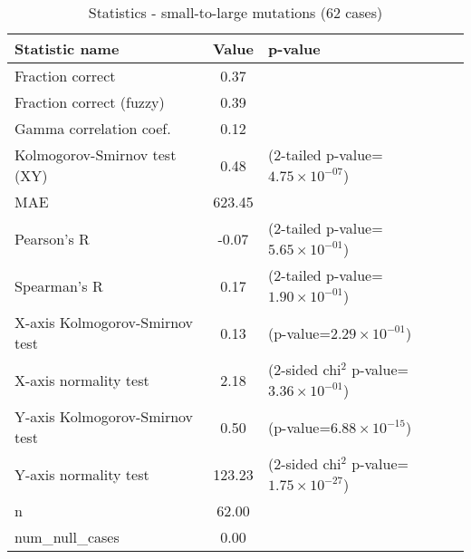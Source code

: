 \documentclass[10pt, letterpaper, oneside, titlepage, landscape]{scrreprt}
\begin{document}
\begin{table}[H]\begin{center}
\begin{tabular}{ l S[table-format=3.2] l}
Statistic name & {Value} & p-value\\
\hline
Fraction correct & 0.37 & \\
Fraction correct (fuzzy) & 0.39 & \\
Gamma correlation coef. & 0.12 & \\
Kolmogorov-Smirnov test (XY) & 0.48 & (2-tailed p-value=$4.75\times10^{-07}$)\\
MAE & 623.45 & \\
Pearson's R & -0.07 & (2-tailed p-value=$5.65\times10^{-01}$)\\
Spearman's R & 0.17 & (2-tailed p-value=$1.90\times10^{-01}$)\\
X-axis Kolmogorov-Smirnov test & 0.13 & (p-value=$2.29\times10^{-01}$)\\
X-axis normality test & 2.18 & (2-sided chi$^{2}$ p-value=$3.36\times10^{-01}$)\\
Y-axis Kolmogorov-Smirnov test & 0.50 & (p-value=$6.88\times10^{-15}$)\\
Y-axis normality test & 123.23 & (2-sided chi$^{2}$ p-value=$1.75\times10^{-27}$)\\
n & 62.00 & \\
num\_null\_cases & 0.00 & \\
\end{tabular}
\caption{Statistics - small-to-large mutations (62 cases)}
\end{center}\end{table}
\end{document}
